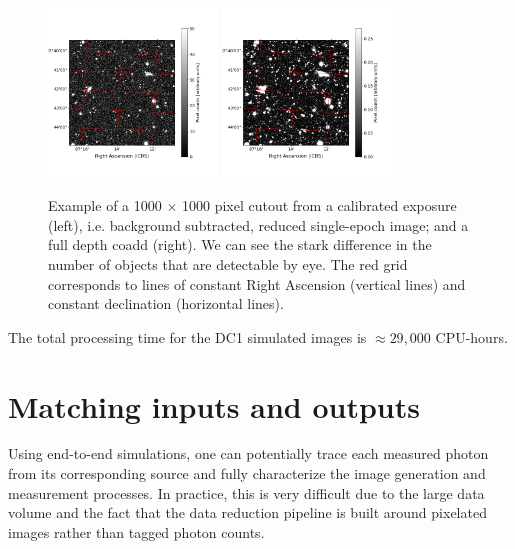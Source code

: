 \documentclass[a4paper,fleqn,usenatbib]{mnras}
\begin{document}
\begin{figure}
\centering
\includegraphics[width=0.4\textwidth]{calexp_example.png}
\includegraphics[width=0.4\textwidth]{coadd_example.png}
\caption{Example of a 1000 $\times$ 1000 pixel cutout from a calibrated exposure (left), i.e. background subtracted, reduced single-epoch image; and a full depth coadd (right). We can see the stark difference in the number of objects that are detectable by eye. The red grid corresponds to lines of constant Right Ascension (vertical lines) and constant declination (horizontal lines).}
\label{fig:coadd_example}
\end{figure}

The total processing time for the DC1 simulated images is $\approx 29,000$ CPU-hours.

\section{Matching inputs and outputs}
\label{sec:matching}

Using end-to-end simulations, one can potentially trace each measured photon from its corresponding source and fully characterize the image generation and measurement processes. In practice, this is very difficult due to the large data volume and the fact that the data reduction pipeline is built around pixelated images rather than tagged photon counts.
\end{document}

